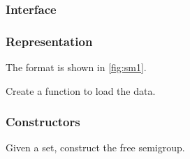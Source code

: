 \subsubsection*{Interface}


\subsubsection*{Representation}

The format is shown in \cref{fig:sm1}.



\begin{gradedexercise}
\label{ex:TestFiniteSemigroupRepresentation}
Create a function to load the data.



\end{gradedexercise}

\subsubsection*{Constructors}

\begin{gradedexercise}
  \label{ex:FiniteSemigroupRepresentation}
Given a set, construct the free semigroup.

\end{gradedexercise}
